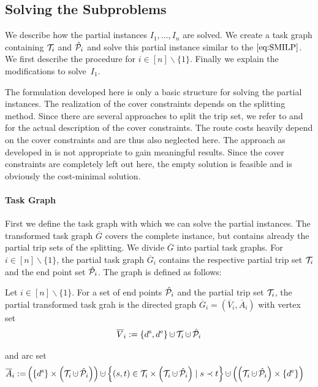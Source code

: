 \subsection{Solving the Subproblems}

We describe how the partial instances ${I_1,\dots,I_n}$ are solved. We create a task graph containing $\mathcal{T}_i$ and $\hat{\mathcal{P}}_i$ and solve this partial instance similar to the $\eqref{eq:SMILP}$. We first describe the procedure for ${i\in[n]\backslash\{1\}}$. Finally we explain the modifications to solve~$I_1$.

\begin{remark}

The formulation developed here is only a basic structure for solving the partial instances. The realization of the cover constraints depends on the splitting method. Since there are several approaches to split the trip set, we refer to  and  for the actual description of the cover constraints. The route costs heavily depend on the cover constraints and are thus also neglected here. The approach as developed in  is not appropriate to gain meaningful results. Since the cover constraints are completely left out here, the empty solution is feasible and is obviously the cost-minimal solution.

\end{remark}

\paragraph{Task Graph} \parfill

First we define the task graph with which we can solve the partial instances. The transformed task graph $\overline{G}$ covers the complete instance, but contains already the partial trip sets of the splitting. We divide $\overline{G}$ into partial task graphs. For ${i\in[n]\backslash\{1\}}$, the partial task graph $\overline{G}_i$ contains the respective partial trip set $\mathcal{T}_i$ and the end point set $\hat{\mathcal{P}}_i$. The graph is defined as follows:

\begin{definition}

Let ${i\in[n]\backslash\{1\}}$. For a set of end points $\hat{\mathcal{P}}_i$ and the partial trip set $\mathcal{T}_i$, the partial transformed task grah is the directed graph ${\overline{G}_i=\left(\overline{V}_i,\overline{A}_i\right)}$ with vertex set
\begin{align*}
	\overline{V}_i := \left\{\ds,\de\right\}\cupdot\Ti\cupdot\Phat_i
\end{align*}

and arc set
\begin{align*}
	\overline{A}_i := & \left(\left\{\ds\right\}\times\left(\Ti\cupdot\Phat_i\right)\right)\cupdot\left\{(s,t)\in\Ti\times\left(\Ti\cupdot\Phat_i\right)\mid s\prec t\right\} \cupdot\left(\left(\Ti\cupdot\Phat_i\right)\times\left\{\de\right\}\right)
\end{align*}

\end{definition}

